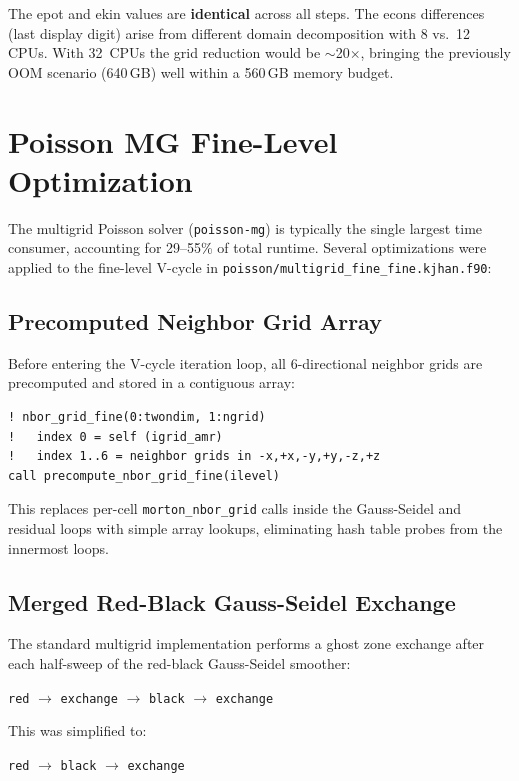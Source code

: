 \documentclass[11pt,fleqn]{book}
\begin{document}
The epot and ekin values are \textbf{identical} across all steps.  The econs differences (last display digit) arise from different domain decomposition with 8 vs.\ 12 CPUs.  With 32~CPUs the grid reduction would be $\sim$20$\times$, bringing the previously OOM scenario (640\,GB) well within a 560\,GB memory budget.


\section{Poisson MG Fine-Level Optimization}

The multigrid Poisson solver (\texttt{poisson-mg}) is typically the single largest time consumer, accounting for 29--55\% of total runtime. Several optimizations were applied to the fine-level V-cycle in \texttt{poisson/multigrid\_fine\_fine.kjhan.f90}:

\subsection{Precomputed Neighbor Grid Array}

Before entering the V-cycle iteration loop, all 6-directional neighbor grids are precomputed and stored in a contiguous array:

\begin{lstlisting}[style=fortran,numbers=none]
! nbor_grid_fine(0:twondim, 1:ngrid)
!   index 0 = self (igrid_amr)
!   index 1..6 = neighbor grids in -x,+x,-y,+y,-z,+z
call precompute_nbor_grid_fine(ilevel)
\end{lstlisting}

This replaces per-cell \texttt{morton\_nbor\_grid} calls inside the Gauss-Seidel and residual loops with simple array lookups, eliminating hash table probes from the innermost loops.

\subsection{Merged Red-Black Gauss-Seidel Exchange}

The standard multigrid implementation performs a ghost zone exchange after each half-sweep of the red-black Gauss-Seidel smoother:
\begin{center}
\texttt{red} $\to$ \texttt{exchange} $\to$ \texttt{black} $\to$ \texttt{exchange}
\end{center}

This was simplified to:
\begin{center}
\texttt{red} $\to$ \texttt{black} $\to$ \texttt{exchange}
\end{center}
\end{document}
